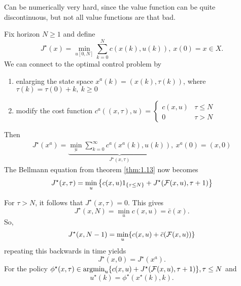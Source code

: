 Can be numerically very hard, since the value function can be quite discontinuous, but not all value functions are that bad.

 Fix horizon \(N\geq 1\) and define 
\[J^\star(x)=\min_{u[0,N]}\sum_{k=0}^N c(x(k),u(k)),\ x(0)=x\in X.\]
We can connect to the optimal control problem by 
\begin{enumerate}
    \item enlarging the state space \(x^a(k)=(x(k),\tau(k))\), where \(\tau(k)=\tau(0)+k,\ k\geq 0\)
    \item modify the cost function \(c^a((x,\tau),u)=\begin{cases}
        c(x,u) & \tau \leq N\\
        0 & \tau >N
    \end{cases}\)
\end{enumerate}
Then 
\begin{align*}
    J^\star(x^a)=\underbrace{\min_{\underbar{u}}\sum_{k=0}^\infty c^a(x^a(k),u(k))}_{J^\star(x,\tau)},\ x^a(0)=(x,0)
\end{align*}
The Bellmann equation from theorem \ref{thm:1.13} now becomes 
\begin{equation}\label{eq:bellmann_finitetime}
    J^\star(x,\tau)=\min_u\left\{c(x,u)1_{\{\tau \leq N\}}+J^\star(\mathcal{F}(x,u),\tau+1)\right\}
\end{equation}

For \(\tau>N\), it follows that \(J^\star(x,\tau)=0\).
This gives 
\[J^\star(x,N)=\min_{u}c(x,u)=\bar{c}(x).\]
So, \[J^\star(x,N-1)=\min_{u}\{c(x,u)+\bar{c}(\mathcal{F}(x,u))\}\]
repeating this backwards in time yields 
\[J^\star(x,0)=J^\star(x^a).\]
For the policy \(\phi^\star(x,\tau)\in \operatorname*{\text{argmin}}_{u}\{c(x,u)+J^\star(\mathcal{F}(x,u),\tau+1)\},\tau \leq N\)
and \[u^\star(k)=\phi^\star(x^\star(k),k).\]

